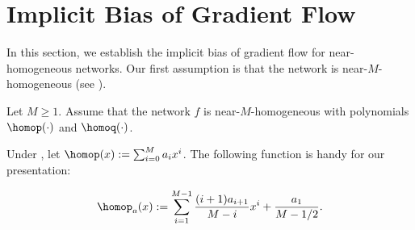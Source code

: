 \section{Implicit Bias of Gradient Flow} \label{sec:margin-direct}
In this section, we establish the implicit bias of gradient flow for near-homogeneous networks. 
Our first assumption is that the network is near-$M$-homogeneous (see ). 
\begin{assumption}
\label{asp:nearhomo}
Let $M\ge 1$.
Assume that the network $f$ is near-$M$-homogeneous with polynomials $\homop(\cdot)$ and $\homoq(\cdot)$. 
\end{assumption}


Under , let
$\homop(x) := \sum_{i=0}^M a_i x^i$. The following function is handy for our presentation: 

\begin{comment}
\begin{equation}
\label{eq:def-pa}
\homop_a (x) := 
\begin{cases}
\sum_{i=1}^{M-1} \frac{(i+1)a_{i+1}}{M-i} x^{i} + \frac{a_1}{M-1}, &\text{ if }  M\ge 2 ;\\
a_1 + 1, &\text{ if } M=1 .
\end{cases}
\end{equation}
\end{comment}

\begin{equation}\label{eq:def-pa}
\homop_a (x) := \sum_{i=1}^{M-1} \frac{(i+1)a_{i+1}}{M-i} x^{i} + \frac{a_1}{M-1/2}.
\end{equation}


